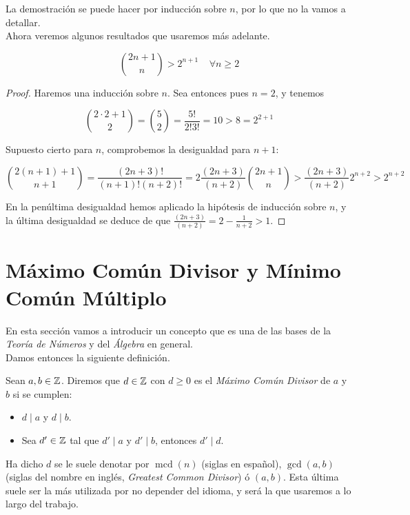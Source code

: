La demostración se puede hacer por inducción sobre $n$, por lo que no la vamos a detallar.\\

Ahora veremos algunos resultados que usaremos más adelante.

\begin{lema}\label{binomio_cota_inferior_2n}
	\begin{equation}
	\binom{2n + 1}{n} > 2^{n+1}\;\;\;\;\forall n \geq 2
	\end{equation}
\end{lema}

\begin{proof}
	Haremos una inducción sobre $n$. Sea entonces pues $n=2$, y tenemos
	
	\[ \binom{2\cdot2 + 1}{2} = \binom{5}{2} = \frac{5!}{2!3!} = 10 > 8 = 2^{2+1} \]
	
	Supuesto cierto para $n$, comprobemos la desigualdad para $n+1$:
	
	\[ \binom{2(n+1) + 1}{n+1} = \frac{(2n+3)!}{(n+1)!(n+2)!} = 2\frac{(2n+3)}{(n+2)}\binom{2n+1}{n} > \frac{(2n+3)}{(n+2)}2^{n+2} > 2^{n+2} \]
	
	En la penúltima desigualdad hemos aplicado la hipótesis de inducción sobre $n$, y la última desigualdad se deduce de que $\frac{(2n+3)}{(n+2)} = 2 - \frac{1}{n+2} > 1$.
\end{proof}

\section{Máximo Común Divisor y Mínimo Común Múltiplo}

En esta sección vamos a introducir un concepto que es una de las bases de la \textit{Teoría de Números} y del \textit{Álgebra} en general.\\

Damos entonces la siguiente definición.

\begin{definicion}
	Sean $a, b \in \mathbb{Z}$. Diremos que $d \in \mathbb{Z}$ con $d \geq 0$ es el \textit{Máximo Común Divisor} de $a$ y $b$ si se cumplen:
	
	\begin{itemize}
		\item $d \mid a$ y $d \mid b$.
		
		\item Sea $d' \in \mathbb{Z}$ tal que $d' \mid a$ y $d' \mid b$, entonces $d' \mid d$.
	\end{itemize} 
	
	Ha dicho $d$ se le suele denotar por $\mathop{mcd}(n)$ (siglas en español), $\gcd(a, b)$ (siglas del nombre en inglés, \textit{Greatest Common Divisor}) ó $(a, b)$. Esta última suele ser la más utilizada por no depender del idioma, y será la que usaremos a lo largo del trabajo.
\end{definicion}

